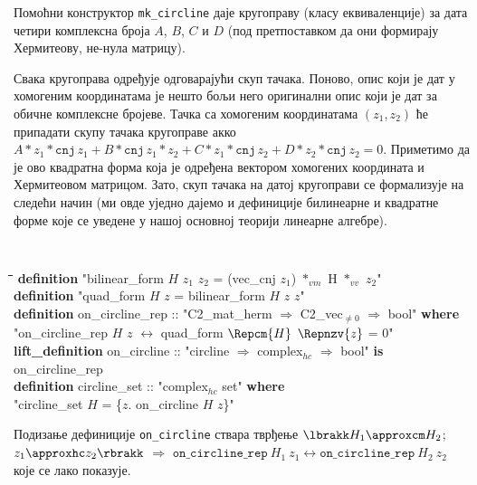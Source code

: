 Помоћни конструктор {\tt mk\_circline} даје кругоправу (класу
еквиваленције) за дата четири комплексна броја $A$, $B$, $C$ и $D$
(под претпоставком да они формирају Хермитеову, не-нула матрицу).

Свака кругоправа одређује одговарајући скуп тачака. Поново, опис који
је дат у хомогеним координатама је нешто бољи него оригинални опис
који је дат за обичне комплексне бројеве. Тачка са хомогеним
координатама $(z_1, z_2)$ ће припадати скупу тачака кругоправе акко
$A*z_1*\mathtt{cnj}\,z_1 + B*\mathtt{cnj}\,z_1*z_2 +
C*z_1*\mathtt{cnj}\,z_2 + D*z_2*\mathtt{cnj}\,z_2 = 0$. Приметимо да
је ово квадратна форма која је одређена вектором хомогених координата
и Хермитеовом матрицом. Зато, скуп тачака на датој кругоправи се
формализује на следећи начин (ми овде уједно дајемо и дефиниције
билинеарне и квадратне форме које се уведене у нашој основној теорији
линеарне алгебре).

{\tt
\begin{tabbing}
\hspace{5mm}\=\hspace{5mm}\=\hspace{5mm}\=\hspace{5mm}\=\hspace{5mm}\=\kill
{\bf definition} "bilinear\_form $H$ $z_1$ $z_2$ = (vec\_cnj $z_1$) $*_{vm}$ H $*_{vv}$ $z_2$"\\
{\bf definition} "quad\_form $H$ $z$ = bilinear\_form $H$ $z$ $z$"\\
{\bf definition} on\_circline\_rep :: "C2\_mat\_herm $\Rightarrow$ C2\_vec$_{\neq 0}$ $\Rightarrow$ bool" {\bf where}\\
\>"on\_circline\_rep $H$ $z$ $\longleftrightarrow$ quad\_form $\Repcm{H}$ $\Repnzv{z}$ = 0"\\
{\bf lift\_definition} on\_circline :: "circline $\Rightarrow$ complex$_{hc}$ $\Rightarrow$ bool" {\bf is}\\
\> on\_circline\_rep\\
{\bf definition} circline\_set :: "complex$_{hc}$ set" {\bf where} \\
\>"circline\_set $H$ = \{$z$. on\_circline $H$ $z$\}"
\end{tabbing}
}

\noindent Подизање дефиниције {\tt on\_circline} ствара тврђење
$\lbrakk H_1 \approxcm H_2$; $z_1 \approxhc z_2 \rbrakk$
$\Longrightarrow$ $\mathtt{on\_circline\_rep}\ H_1\ z_1
\longleftrightarrow \mathtt{on\_circline\_rep}\ H_2\ z_2$ које се лако
показује.


